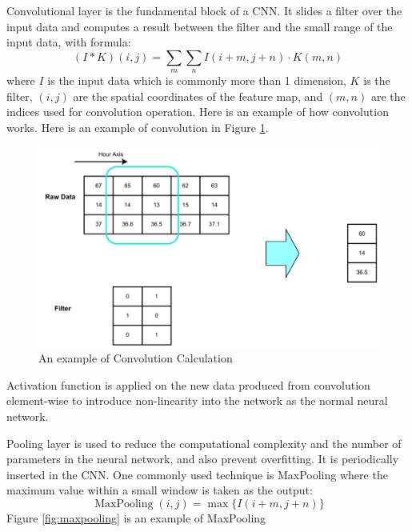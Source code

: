 \documentclass[12pt,a4paper,english
]{tunithesis}
\begin{document}
Convolutional layer is the fundamental block of a CNN. It slides a filter over the input data and computes a result between the filter and the small range of the input data, with formula:
\begin{equation}
    (I * K)(i, j)=\sum_m \sum_n I(i+m, j+n) \cdot K(m, n)
\end{equation}
where $I$ is the input data which is commonly more than 1 dimension, $K$ is the filter, $(i, j)$ are the spatial coordinates of the feature map, and $(m, n)$ are the indices used for convolution operation. Here is an example of how convolution works. Here is an example of convolution in Figure \ref{fig:convolution}.

\begin{figure}
  \begin{center}
    \includegraphics[width=1\textwidth]{thesis/img/convolution.pdf}
  \end{center}
  \caption[Convolution]{An example of Convolution Calculation}
  \label{fig:convolution}
\end{figure}

Activation function is applied on the new data produced from convolution element-wise to introduce non-linearity into the network as the normal neural network.

Pooling layer is used to reduce the computational complexity and the number of parameters in the neural network, and also prevent overfitting. It is periodically inserted in the CNN. One commonly used technique is MaxPooling where the maximum value within a small window is taken as the output:
\begin{equation}
    \operatorname{MaxPooling}(i, j)=\max \{I(i+m, j+n)\}
\end{equation}
Figure \ref{fig:maxpooling} is an example of MaxPooling
\end{document}
